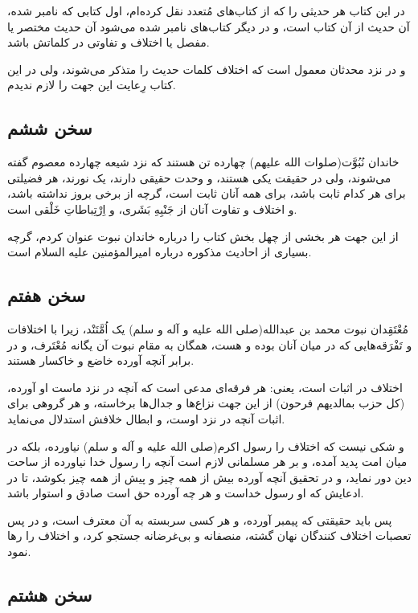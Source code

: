 در این کتاب هر حدیثی را که از کتاب‌های مُتعدد نقل کرده‌ام، اول کتابی که
نامبر شده، آن حدیث از آن کتاب است، و در دیگر کتاب‌های نامبر شده می‌شود
آن حدیث مختصر یا مفصل یا اختلاف و تفاوتی در کلماتش باشد.

و در نزد محدثان معمول است که اختلاف کلمات حدیث را متذکر می‌شوند، ولی در
این کتاب رِعایت این جهت را لازم ندیدم.

\subsection*{سخن ششم}

خاندان نُبُوَّت(صلوات الله علیهم) چهارده تن هستند که نزد شیعه چهارده معصوم
گفته می‌شوند، ولی در حقیقت یکی هستند، و وحدت حقیقی دارند، یک نورند، هر
فضیلتی برای هر کدام ثابت باشد، برای همه آنان ثابت است، گرچه از برخی
بروز نداشته باشد، و اختلاف و تفاوت آنان از جَنْبِهِ بَشَری، و اِرْتِباطاتِ خَلْقی
است.

از این جهت هر بخشی از چهل بخش کتاب را درباره خاندان نبوت عنوان کردم،
گرچه بسیاری از احادیث مذکوره درباره امیرالمؤمنین علیه السلام است.

\subsection*{سخن هفتم}

مُعْتَقِدان نبوت محمد بن عبدالله(صلی الله علیه و آله و سلم) یک اُمَّتَنْد، زیرا
با اختلافات و تَفْرَقه‌هایی که در میان آنان بوده و هست، همگان به مقام نبوت
آن یگانه مُعْتَرف، و در برابر آنچه آورده خاضع و خاکسار هستند.

اختلاف در اثبات است، یعنی: هر فرقه‌ای مدعی است که آنچه در نزد ماست او
آورده، (کل حزب بمالدیهم فرحون) از این جهت نزاع‌ها و جدال‌ها برخاسته، و
هر گروهی برای اثبات آنچه در نزد اوست، و ابطال خلافش استدلال می‌نماید.

و شکی نیست که اختلاف را رسول اکرم(صلی الله علیه و آله و سلم) نیاورده،
بلکه در میان امت پدید آمده، و بر هر مسلمانی لازم است آنچه را رسول خدا
نیاورده از ساحت دین دور نماید، و در تحقیق آنچه آورده بیش از همه چیز و
پیش از همه چیز بکوشد، تا در ادعایش که او رسول خداست و هر چه آورده حق
است صادق و استوار باشد.

پس باید حقیقتی که پیمبر آورده، و هر کسی سربسته به آن معترف است، و در
پس تعصبات اختلاف کنندگان نهان گشته، منصفانه و بی‌غرضانه جستجو کرد، و
اختلاف را رها نمود.

\subsection*{سخن هشتم}

